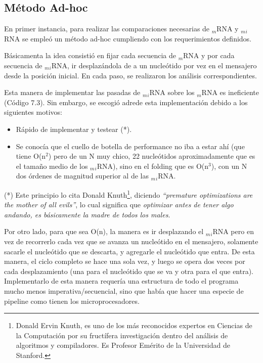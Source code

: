 \subsection{Método Ad-hoc}
\par En primer instancia, para realizar las comparaciones necesarias de $_m$RNA y $_m$$_i$RNA se empleó un método ad-hoc cumpliendo con los requerimientos definidos.
\par Básicamenta la idea consistió en fijar cada secuencia de $_m$RNA y por cada secuencia de $_m$$_i$RNA, ir desplazándola de a un nucleótido por vez en el mensajero desde la posición inicial. En cada paso, se realizaron los análisis correspondientes.
\par Esta manera de implementar las pasadas de $_m$$_i$RNA sobre los $_m$RNA es ineficiente (Código 7.3). Sin embargo, se escogió adrede esta implementación debido a los siguientes motivos:
\begin{itemize}
	\item Rápido de implementar y testear (*).
	\item Se conocía que el cuello de botella de performance no iba a estar ahí (que tiene O(n$^2$) pero de un N muy chico, 22 nucleótidos aproximadamente que es el tamaño medio de los $_m$$_i$RNA), sino en el folding que es O(n$^3$), con un N dos órdenes de magnitud superior al de las $_m$$_i$RNA.
\end{itemize}

\par (*) Este principio lo cita Donald Knuth\footnote{Donald Ervin Knuth, es uno de los más reconocidos expertos en Ciencias de la Computación por su fructífera investigación dentro del análisis de algoritmos y compiladores. Es Profesor Emérito de la Universidad de Stanford.}, diciendo \emph{``premature optimizations are the mother of all evils''}, lo cual significa que \emph{optimizar antes de tener algo andando, es básicamente la madre de todos los males}.

\par Por otro lado, para que sea O(n), la manera es ir desplazando el $_m$$_i$RNA pero en vez de recorrerlo cada vez que se avanza un nucleótido en el mensajero, solamente sacarle el nucleótido que se descarta, y agregarle el nucleótido que entra. De esta manera, el ciclo completo se hace una sola vez, y luego se opera dos veces por cada desplazamiento (una para el nucleótido que se va y otra para el que entra). Implementarlo de esta manera requería una estructura de todo el programa mucho menos imperativa/secuencial, sino que había que hacer una especie de pipeline como tienen los microprocesadores.

